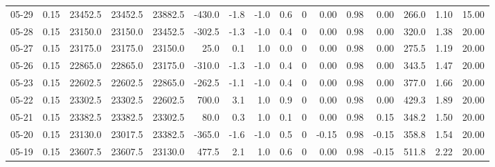 \begin{threeparttable}
{\begin{tabular}{lrrrrrrrrrrrrrrr}
  05-29 &     0.15 & 23452.5 & 23452.5 & 23882.5 &     -430.0 &           -1.8 &                     -1.0 &                 0.6 &              0 &       0.00 &      0.98 &           0.00 &            266.0 &            1.10 &                  15.00 \\
  05-28 &     0.15 & 23150.0 & 23150.0 & 23452.5 &     -302.5 &           -1.3 &                     -1.0 &                 0.4 &              0 &       0.00 &      0.98 &           0.00 &            320.0 &            1.38 &                  20.00 \\
  05-27 &     0.15 & 23175.0 & 23175.0 & 23150.0 &       25.0 &            0.1 &                      1.0 &                 0.0 &              0 &       0.00 &      0.98 &           0.00 &            275.5 &            1.19 &                  20.00 \\
  05-26 &     0.15 & 22865.0 & 22865.0 & 23175.0 &     -310.0 &           -1.3 &                     -1.0 &                 0.4 &              0 &       0.00 &      0.98 &           0.00 &            343.5 &            1.47 &                  20.00 \\
  05-23 &     0.15 & 22602.5 & 22602.5 & 22865.0 &     -262.5 &           -1.1 &                     -1.0 &                 0.4 &              0 &       0.00 &      0.98 &           0.00 &            377.0 &            1.66 &                  20.00 \\
  05-22 &     0.15 & 23302.5 & 23302.5 & 22602.5 &      700.0 &            3.1 &                      1.0 &                 0.9 &              0 &       0.00 &      0.98 &           0.00 &            429.3 &            1.89 &                  20.00 \\
  05-21 &     0.15 & 23382.5 & 23382.5 & 23302.5 &       80.0 &            0.3 &                      1.0 &                 0.1 &              0 &       0.00 &      0.98 &           0.15 &            348.2 &            1.50 &                  20.00 \\
  05-20 &     0.15 & 23130.0 & 23017.5 & 23382.5 &     -365.0 &           -1.6 &                     -1.0 &                 0.5 &              0 &      -0.15 &      0.98 &          -0.15 &            358.8 &            1.54 &                  20.00 \\
  05-19 &     0.15 & 23607.5 & 23607.5 & 23130.0 &      477.5 &            2.1 &                      1.0 &                 0.6 &              0 &       0.00 &      0.98 &          -0.15 &            511.8 &            2.22 &                  20.00 \\

\end{tabular}}
\end{threeparttable}
